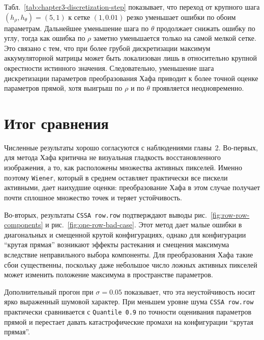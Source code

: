 \begin{table}[H]
	\centering
	\caption{Влияние шага дискретизации параметров Хафа на точность оценивания после \texttt{CSSA row.row}}
	\label{tab:chapter3-discretization-step}
	\resizebox{\textwidth}{!}{
	
	}
\end{table}

Табл.~\ref{tab:chapter3-discretization-step} показывает, что переход от
крупного шага $(h_\rho, h_\theta)=(5, 1)$ к сетке $(1, 0.01)$ резко уменьшает
ошибки по обоим параметрам. Дальнейшее уменьшение шага по $\theta$ продолжает
снижать ошибку по углу, тогда как ошибка по $\rho$ заметно уменьшается только
на самой мелкой сетке. Это связано с тем, что при более грубой дискретизации
максимум аккумуляторной матрицы может быть локализован лишь в относительно
крупной окрестности истинного значения. Следовательно, уменьшение шага
дискретизации параметров преобразования Хафа приводит к более точной оценке
параметров прямой, хотя выигрыш по $\rho$ и по $\theta$ проявляется
неодновременно.

\section{Итог сравнения}

Численные результаты хорошо согласуются с наблюдениями главы~2. Во-первых,
для метода Хафа критична не визуальная гладкость восстановленного
изображения, а то, как расположены множества активных пикселей.
Именно поэтому \texttt{Wiener}, который в среднем оставляет практически все пискели 
активными, дает наихудшие оценки: преобразование Хафа в этом случае
получает почти сплошное множество точек и теряет устойчивость.

Во-вторых, результаты \texttt{CSSA row.row} подтверждают выводы
рис.~\ref{fig:row-row-components} и рис.~\ref{fig:one-row-bad-case}. Этот
метод дает малые ошибки в диагональных и смещенной крутой конфигурациях,
однако для конфигурации ``крутая прямая'' возникают эффекты растекания и
смещения максимума вследствие неправильного выбора компоненты. Для
преобразования Хафа такие сбои существенны, поскольку даже небольшое число
ложных активных пикселей может изменить положение максимума в пространстве
параметров.

Дополнительный прогон при $\sigma=0.05$ показывает, что эта неустойчивость
носит ярко выраженный шумовой характер. При меньшем уровне шума
\texttt{CSSA row.row} практически сравнивается с \texttt{Quantile 0.9} по
точности оценивания параметров прямой и перестает давать катастрофические
промахи на конфигурации ``крутая прямая''.

